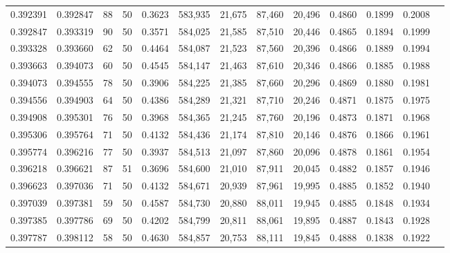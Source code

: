\begin{tabular}{rrrrrrrrrrrrr}
0.392391 & 0.392847 &    88 &  50 &                                     0.3623 & 583,935 &  21,675 &  87,460 &  20,496 & 0.4860 & 0.1899 & 0.2008 \\
0.392847 & 0.393319 &    90 &  50 &                                     0.3571 & 584,025 &  21,585 &  87,510 &  20,446 & 0.4865 & 0.1894 & 0.1999 \\
0.393328 & 0.393660 &    62 &  50 &                                     0.4464 & 584,087 &  21,523 &  87,560 &  20,396 & 0.4866 & 0.1889 & 0.1994 \\
0.393663 & 0.394073 &    60 &  50 &                                     0.4545 & 584,147 &  21,463 &  87,610 &  20,346 & 0.4866 & 0.1885 & 0.1988 \\
0.394073 & 0.394555 &    78 &  50 &                                     0.3906 & 584,225 &  21,385 &  87,660 &  20,296 & 0.4869 & 0.1880 & 0.1981 \\
0.394556 & 0.394903 &    64 &  50 &                                     0.4386 & 584,289 &  21,321 &  87,710 &  20,246 & 0.4871 & 0.1875 & 0.1975 \\
0.394908 & 0.395301 &    76 &  50 &                                     0.3968 & 584,365 &  21,245 &  87,760 &  20,196 & 0.4873 & 0.1871 & 0.1968 \\
0.395306 & 0.395764 &    71 &  50 &                                     0.4132 & 584,436 &  21,174 &  87,810 &  20,146 & 0.4876 & 0.1866 & 0.1961 \\
0.395774 & 0.396216 &    77 &  50 &                                     0.3937 & 584,513 &  21,097 &  87,860 &  20,096 & 0.4878 & 0.1861 & 0.1954 \\
0.396218 & 0.396621 &    87 &  51 &                                     0.3696 & 584,600 &  21,010 &  87,911 &  20,045 & 0.4882 & 0.1857 & 0.1946 \\
0.396623 & 0.397036 &    71 &  50 &                                     0.4132 & 584,671 &  20,939 &  87,961 &  19,995 & 0.4885 & 0.1852 & 0.1940 \\
0.397039 & 0.397381 &    59 &  50 &                                     0.4587 & 584,730 &  20,880 &  88,011 &  19,945 & 0.4885 & 0.1848 & 0.1934 \\
0.397385 & 0.397786 &    69 &  50 &                                     0.4202 & 584,799 &  20,811 &  88,061 &  19,895 & 0.4887 & 0.1843 & 0.1928 \\
0.397787 & 0.398112 &    58 &  50 &                                     0.4630 & 584,857 &  20,753 &  88,111 &  19,845 & 0.4888 & 0.1838 & 0.1922 \\

\end{tabular}
